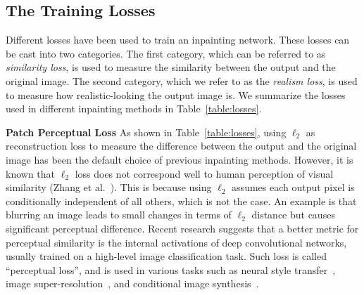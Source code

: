 \subsection{The Training Losses}
Different losses have been used to train an inpainting network. These losses can be cast into two categories. The first category, which can be referred to as \textit{similarity loss}, is used to measure the similarity between the output and the original image. The second category, which we refer to as the \textit{realism loss}, is used to measure how realistic-looking the output image is. We summarize the losses used in different inpainting methods in Table~\ref{table:losses}. 

\begin{table}[h!]
\begin{center}

  \end{center}
  \caption{Comparison of training losses used in different methods.}
  \vspace{-15pt}
  \label{table:losses}
\end{table}

\noindent\textbf{Patch Perceptual Loss} As shown in Table~\ref{table:losses}, using $\ell_2$ as reconstruction loss to measure the difference between the output and the original image has been the default choice of previous inpainting methods. However, it is known that $\ell_2$ loss does not correspond well to human perception of visual similarity (Zhang et al.~\cite{zhang2018unreasonable}). This is because using $\ell_2$ assumes each output pixel is conditionally independent of all others, which is not the case. An example is that blurring an image leads to small changes in terms of $\ell_2$ distance but causes significant perceptual difference. Recent research suggests that a better metric for perceptual similarity is the internal activations of deep convolutional networks, usually trained on a high-level image classification task. Such loss is called ``perceptual loss'', and is used in various tasks such as neural style transfer~\cite{gatys2016image}, image super-resolution~\cite{johnson2016perceptual}, and conditional image synthesis~\cite{dosovitskiy2016generating,chen2017photographic}.

